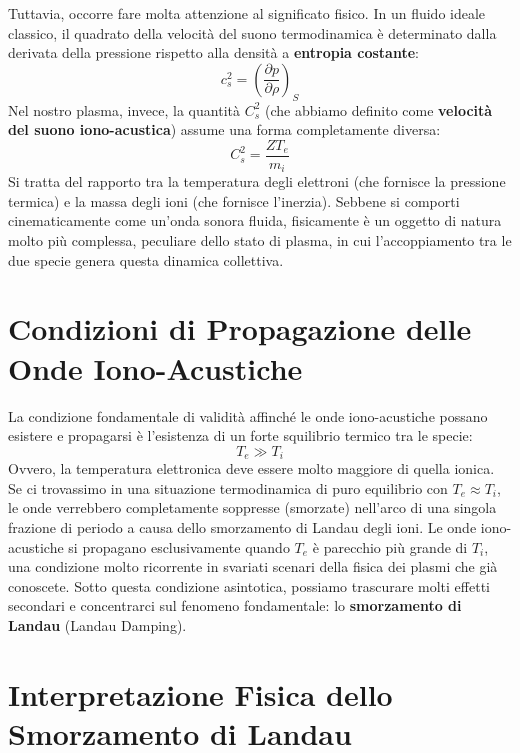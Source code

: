 Tuttavia, occorre fare molta attenzione al significato fisico. In un fluido ideale classico, il quadrato della velocità del suono termodinamica è determinato dalla derivata della pressione rispetto alla densità a \textbf{entropia costante}:
\begin{equation}
c_s^2 = \left( \frac{\partial p}{\partial \rho} \right)_S
\end{equation}
Nel nostro plasma, invece, la quantità $C_s^2$ (che abbiamo definito come \textbf{velocità del suono iono-acustica}) assume una forma completamente diversa:
\begin{equation}
C_s^2 = \frac{Z T_e}{m_i}
\end{equation}
Si tratta del rapporto tra la temperatura degli elettroni (che fornisce la pressione termica) e la massa degli ioni (che fornisce l'inerzia). Sebbene si comporti cinematicamente come un'onda sonora fluida, fisicamente è un oggetto di natura molto più complessa, peculiare dello stato di plasma, in cui l'accoppiamento tra le due specie genera questa dinamica collettiva.

\section{Condizioni di Propagazione delle Onde Iono-Acustiche}

La condizione fondamentale di validità affinché le onde iono-acustiche possano esistere e propagarsi è l'esistenza di un forte squilibrio termico tra le specie:
\begin{equation}
T_e \gg T_i
\end{equation}
Ovvero, la temperatura elettronica deve essere molto maggiore di quella ionica. Se ci trovassimo in una situazione termodinamica di puro equilibrio con $T_e \approx T_i$, le onde verrebbero completamente soppresse (smorzate) nell'arco di una singola frazione di periodo a causa dello smorzamento di Landau degli ioni.
Le onde iono-acustiche si propagano esclusivamente quando $T_e$ è parecchio più grande di $T_i$, una condizione molto ricorrente in svariati scenari della fisica dei plasmi che già conoscete. Sotto questa condizione asintotica, possiamo trascurare molti effetti secondari e concentrarci sul fenomeno fondamentale: lo \textbf{smorzamento di Landau} (Landau Damping).

\section{Interpretazione Fisica dello Smorzamento di Landau}

